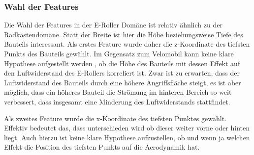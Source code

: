 \subsubsection{Wahl der Features}

Die Wahl der Features in der E-Roller Domäne ist relativ ähnlich zu der Radkastendomäne.
Statt der Breite ist hier die Höhe beziehungsweise Tiefe des Bauteils interessant.
Als erstes Feature wurde daher die z-Koordinate des tiefsten Punkts des Bauteils gewählt.
Im Gegensatz zum Velomobil kann keine klare Hypothese aufgestellt werden , ob die Höhe des Bauteils mit dessen Effekt auf den Luftwiderstand des E-Rollers korreliert ist.
Zwar ist zu erwarten, dass der Luftwiderstand des Bauteils durch eine höhere Angriffsfläche steigt, es ist aber möglich, dass ein höheres Bauteil die Strömung im hinteren Bereich so weit verbessert, dass insgesamt eine Minderung des Luftwiderstands stattfindet.

Als zweites Feature wurde die x-Koordinate des tiefsten Punktes gewählt.
Effektiv bedeutet das, dass unterschieden wird ob dieser weiter vorne oder hinten liegt.
Auch hierzu ist keine klare Hypothese aufzustellen, ob und wenn ja welchen Effekt die Position des tiefsten Punkts auf die Aerodynamik hat.

